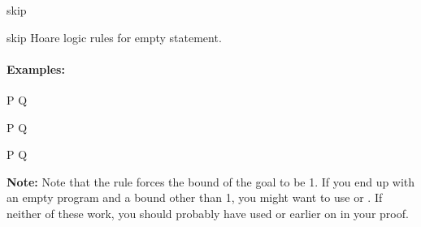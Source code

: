 \begin{tactic}{skip}
  \begin{tsyntax}{skip} Hoare logic rules for empty statement.

  \paragraph{Examples:}\strut

  \begin{cmathpar}
    {P \Rightarrow Q}
    {}

    {P \Rightarrow Q}
    {}

    {P \Rightarrow Q}
    {}
  \end{cmathpar}

  \textbf{Note:} Note that the \phl rule forces the bound of the goal
  to be 1. If you end up with an empty program and a bound other than
  1, you might want to use  or . If
  neither of these work, you should probably have used 
  or  earlier on in your proof.
  \end{tsyntax}
\end{tactic}
